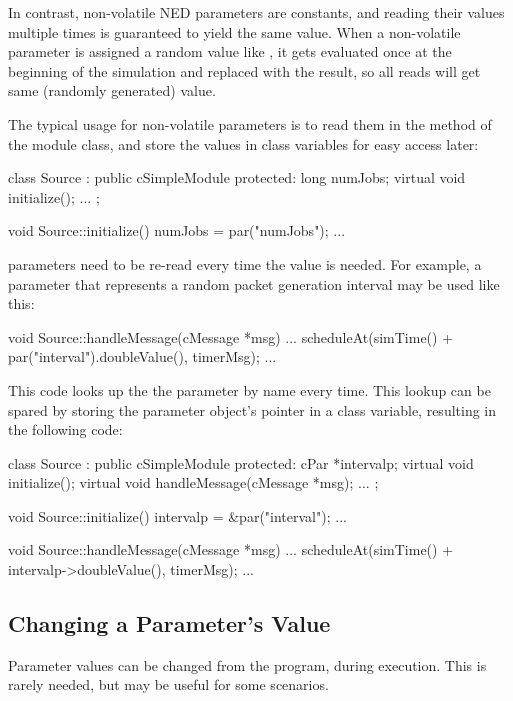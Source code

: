 In contrast, non-volatile NED parameters are constants, and reading their
values multiple times is guaranteed to yield the same value. When a non-volatile
parameter is assigned a random value like , it gets
evaluated once at the beginning of the simulation and replaced with the result,
so all reads will get same (randomly generated) value.

The typical usage for non-volatile parameters is to read them in the
 method of the module class, and store the values
in class variables for easy access later:

\begin{cpp}
class Source : public cSimpleModule
{
  protected:
    long numJobs;
    virtual void initialize();
    ...
};

void Source::initialize()
{
    numJobs = par("numJobs");
    ...
}
\end{cpp}

 parameters need to be re-read every time the value is needed.
For example, a parameter that represents a random packet generation interval
may be used like this:

\begin{cpp}
void Source::handleMessage(cMessage *msg)
{
    ...
    scheduleAt(simTime() + par("interval").doubleValue(), timerMsg);
    ...
}
\end{cpp}

This code looks up the the parameter by name every time. This lookup
can be spared by storing the parameter object's pointer in a class variable,
resulting in the following code:

\begin{cpp}
class Source : public cSimpleModule
{
  protected:
    cPar *intervalp;
    virtual void initialize();
    virtual void handleMessage(cMessage *msg);
    ...
};

void Source::initialize()
{
    intervalp = &par("interval");
    ...
}

void Source::handleMessage(cMessage *msg)
{
    ...
    scheduleAt(simTime() + intervalp->doubleValue(), timerMsg);
    ...
}
\end{cpp}


\subsection{Changing a Parameter's Value}
\label{sec:simple-modules:setting-parameters}

Parameter values can be changed from the program, during execution.
This is rarely needed, but may be useful for some scenarios.

